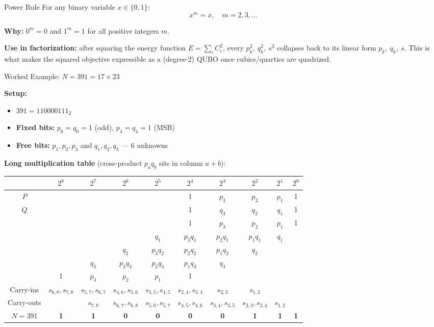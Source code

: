 \documentclass[9pt]{beamer}
\begin{document}
\begin{frame}{Power Rule}
For any binary variable $x \in \{0,1\}$:
\[
x^m = x, \quad m = 2, 3, \dots
\]

\textbf{Why:} $0^m = 0$ and $1^m = 1$ for all positive integers $m$.

\medskip
\textbf{Use in factorization:} after squaring the energy function $E = \sum_i C_i^2$, every $p_k^2,\ q_k^2,\ s^2$ collapses back to its linear form $p_k,\ q_k,\ s$. This is what makes the squared objective expressible as a (degree-2) QUBO once cubics/quartics are quadrized.
\end{frame}



\begin{frame}{Worked Example: $N = 391 = 17 \times 23$}

\textbf{Setup:}
\begin{itemize}
  \item $391 = 110000111_2$
  \item \textbf{Fixed bits:} $p_0 = q_0 = 1$ (odd), $p_4 = q_4 = 1$ (MSB)
  \item \textbf{Free bits:} $p_1, p_2, p_3$ and $q_1, q_2, q_3$ — 6 unknowns
\end{itemize}

\medskip
\textbf{Long multiplication table} (cross-product $p_a q_b$ sits in column $a+b$):

\begin{center}
\scriptsize
\setlength{\tabcolsep}{4pt}
\renewcommand{\arraystretch}{1.4}
\begin{tabular}{|c|c|c|c|c|c|c|c|c|c|}
\hline
 & $2^8$ & $2^7$ & $2^6$ & $2^5$ & $2^4$ & $2^3$ & $2^2$ & $2^1$ & $2^0$ \\
\hline
$P$ &     &     &     &     & 1     & $p_3$ & $p_2$ & $p_1$ & 1     \\
$Q$ &     &     &     &     & 1     & $q_3$ & $q_2$ & $q_1$ & 1     \\
\hline
        &     &     &     &     & 1     & $p_3$ & $p_2$ & $p_1$ & 1 \\
        &     &     &     & $q_1$ & $p_3 q_1$ & $p_2 q_1$ & $p_1 q_1$ & $q_1$ &  \\
        &     &     & $q_2$ & $p_3 q_2$ & $p_2 q_2$ & $p_1 q_2$ & $q_2$ &     &     \\
        &     & $q_3$ & $p_3 q_3$ & $p_2 q_3$ & $p_1 q_3$ & $q_3$ &     &     &     \\
        & 1   & $p_3$ & $p_2$ & $p_1$ & 1     &     &     &     &     \\
\hline
Carry-ins  & $s_{6,8},s_{7,8}$ & $s_{5,7},s_{6,7}$ & $s_{4,6},s_{5,6}$ & $s_{3,5},s_{4,5}$ & $s_{2,4},s_{3,4}$ & $s_{2,3}$ & $s_{1,2}$ & & \\
\hline
Carry-outs & & $s_{7,8}$ & $s_{6,7},s_{6,8}$ & $s_{5,6},s_{5,7}$ & $s_{4,5},s_{4,6}$ & $s_{3,4},s_{3,5}$ & $s_{2,3},s_{2,4}$ & $s_{1,2}$ & \\
\hline
$N=391$ & \textbf{1} & \textbf{1} & \textbf{0} & \textbf{0} & \textbf{0} & \textbf{0} & \textbf{1} & \textbf{1} & \textbf{1} \\
\hline
\end{tabular}
\end{center}


\end{frame}
\end{document}

